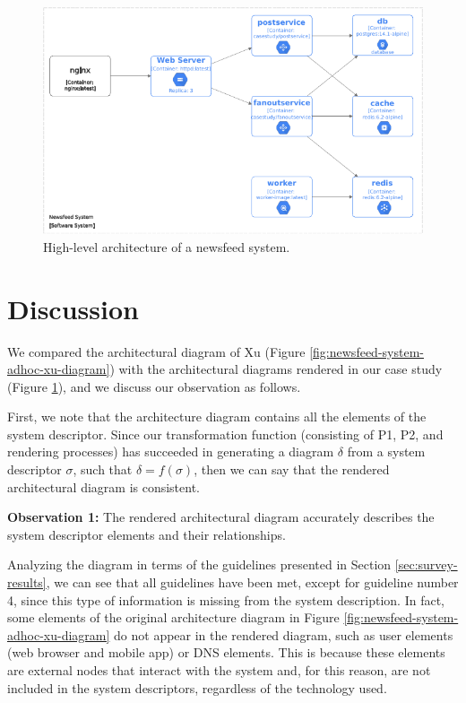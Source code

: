 \documentclass[sigconf]{acmart}
\begin{document}
\begin{figure}[htp]
    \includegraphics[width=1\columnwidth]{figures/rect12353.pdf}
    \caption{High-level architecture of a newsfeed system. }
    \label{fig:newsfeed-system-diagram}
\end{figure}

\section{Discussion}
\label{sec:discussion}

We compared the architectural diagram of Xu \cite{xu2020} (Figure \ref{fig:newsfeed-system-adhoc-xu-diagram}) with the architectural diagrams rendered in our case study (Figure \ref{fig:newsfeed-system-diagram}), and we discuss our observation as follows.

First, we note that the architecture diagram contains all the elements of the system descriptor. Since our transformation function (consisting of P1, P2, and rendering processes) has succeeded in generating a diagram $\delta$ from a system descriptor $\sigma$, such that $\delta = f(\sigma)$, then we can say that the rendered architectural diagram is consistent.

\begin{tcolorbox}[colframe=gray!50, coltitle=black]
	\textbf{Observation 1: }The rendered architectural diagram accurately describes the system descriptor elements and their relationships.
\end{tcolorbox}

Analyzing the diagram in terms of the guidelines presented in Section \ref{sec:survey-results}, we can see that all guidelines have been met, except for guideline number 4, since this type of information is missing from the system description. In fact, some elements of the original architecture diagram in Figure \ref{fig:newsfeed-system-adhoc-xu-diagram} do not appear in the rendered diagram, such as user elements (web browser and mobile app) or DNS elements. This is because these elements are external nodes that interact with the system and, for this reason, are not included in the system descriptors, regardless of the technology used.
\end{document}
